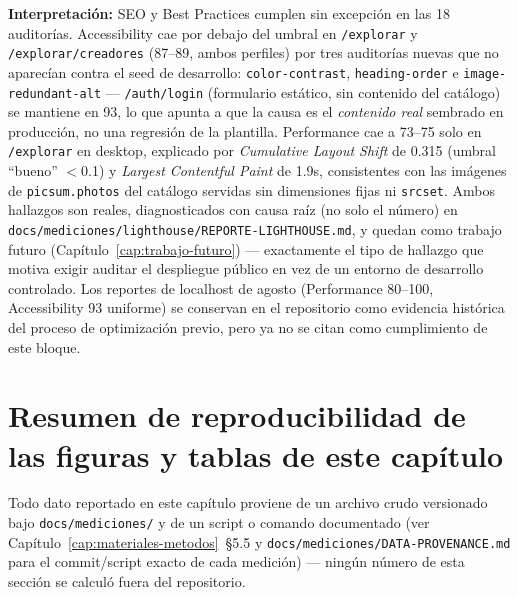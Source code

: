 \textbf{Interpretación:} SEO y Best Practices cumplen sin excepción en
las 18 auditorías. Accessibility cae por debajo del umbral en
\texttt{/explorar} y \texttt{/explorar/creadores} (87--89, ambos
perfiles) por tres auditorías nuevas que no aparecían contra el seed de
desarrollo: \texttt{color-contrast}, \texttt{heading-order} e
\texttt{image-redundant-alt} --- \texttt{/auth/login} (formulario
estático, sin contenido del catálogo) se mantiene en 93, lo que apunta a
que la causa es el \emph{contenido real} sembrado en producción, no una
regresión de la plantilla. Performance cae a 73--75 solo en
\texttt{/explorar} en desktop, explicado por
\emph{Cumulative Layout Shift} de 0.315 (umbral ``bueno'' $<$0.1) y
\emph{Largest Contentful Paint} de 1.9s, consistentes con las imágenes de
\texttt{picsum.photos} del catálogo servidas sin dimensiones fijas ni
\texttt{srcset}. Ambos hallazgos son reales, diagnosticados con causa
raíz (no solo el número) en
\texttt{docs/mediciones/lighthouse/REPORTE-LIGHTHOUSE.md}, y quedan como
trabajo futuro (Capítulo~\ref{cap:trabajo-futuro}) --- exactamente el
tipo de hallazgo que motiva exigir auditar el despliegue público en vez
de un entorno de desarrollo controlado. Los reportes de localhost de
agosto (Performance 80--100, Accessibility 93 uniforme) se conservan en
el repositorio como evidencia histórica del proceso de optimización
previo, pero ya no se citan como cumplimiento de este bloque.

\section{Resumen de reproducibilidad de las figuras y tablas de este capítulo}

Todo dato reportado en este capítulo proviene de un archivo crudo
versionado bajo \texttt{docs/mediciones/} y de un script o comando
documentado (ver Capítulo~\ref{cap:materiales-metodos}~\S5.5 y
\texttt{docs/mediciones/DATA-PROVENANCE.md} para el commit/script exacto
de cada medición) --- ningún número de esta sección se calculó fuera del
repositorio.
